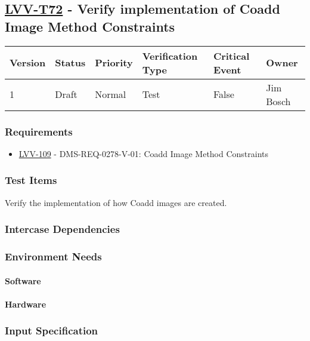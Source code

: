 \subsection{\href{https://jira.lsstcorp.org/secure/Tests.jspa\#/testCase/LVV-T72}{LVV-T72}
    - Verify implementation of Coadd Image Method Constraints}\label{lvv-t72}

\begin{longtable}[]{llllll}
\toprule
Version & Status & Priority & Verification Type & Critical Event & Owner
\\\midrule
1 & Draft & Normal &
Test & False & Jim Bosch
\\\bottomrule
\end{longtable}

\subsubsection{Requirements}
\begin{itemize}
\item \href{https://jira.lsstcorp.org/browse/LVV-109}{LVV-109} - DMS-REQ-0278-V-01: Coadd Image Method Constraints
\end{itemize}

\subsubsection{Test Items}
Verify the implementation of how Coadd images are created.



\subsubsection{Intercase Dependencies}

\subsubsection{Environment Needs}

\paragraph{Software}

\paragraph{Hardware}

\subsubsection{Input Specification}

